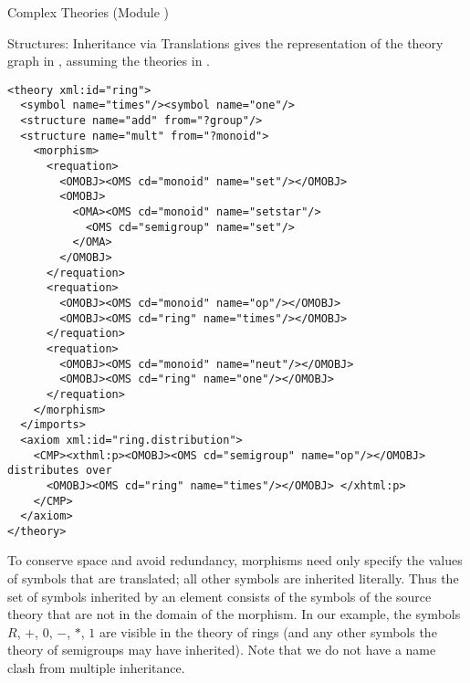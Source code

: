 \begin{tchapter}[id=complex-theories,short=Complex Theories]{Complex Theories (Module
    )}
\begin{tsection}[id=morphisms]{Structures: Inheritance via Translations}
 gives the \omdoc representation of the theory graph in
, assuming the theories in .

\begin{lstlisting}[label=lst:rings,
  caption={A Theory of Rings by Inheritance Via Renaming},
  index={derive,method,premise}]
<theory xml:id="ring"> 
  <symbol name="times"/><symbol name="one"/> 
  <structure name="add" from="?group"/>
  <structure name="mult" from="?monoid">
    <morphism> 
      <requation> 
        <OMOBJ><OMS cd="monoid" name="set"/></OMOBJ>
        <OMOBJ>
          <OMA><OMS cd="monoid" name="setstar"/>
            <OMS cd="semigroup" name="set"/>
          </OMA>
        </OMOBJ>
      </requation> 
      <requation> 
        <OMOBJ><OMS cd="monoid" name="op"/></OMOBJ>
        <OMOBJ><OMS cd="ring" name="times"/></OMOBJ>
      </requation> 
      <requation>
        <OMOBJ><OMS cd="monoid" name="neut"/></OMOBJ>
        <OMOBJ><OMS cd="ring" name="one"/></OMOBJ>
      </requation> 
    </morphism> 
  </imports> 
  <axiom xml:id="ring.distribution"> 
    <CMP><xthml:p><OMOBJ><OMS cd="semigroup" name="op"/></OMOBJ> distributes over 
      <OMOBJ><OMS cd="ring" name="times"/></OMOBJ> </xhtml:p>
    </CMP> 
  </axiom>
</theory>
\end{lstlisting}

To conserve space and avoid redundancy, \omdoc morphisms need only specify the values of
symbols that are translated; all other symbols are inherited literally.  Thus the set of
symbols inherited by an  element consists of the symbols of the source
theory that are not in the domain of the morphism. In our example, the symbols $R$, $+$,
$0$, $-$, $*$, $1$ are visible in the theory of rings (and any other symbols the theory of
semigroups may have inherited). Note that we do not have a name clash from multiple
inheritance.
  

\end{tsection}
\end{tchapter}
